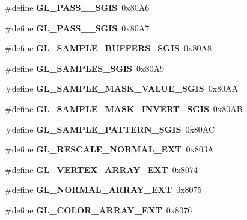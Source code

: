 \begin{DoxyCompactItemize}
\item 
\#define {\bfseries G\+L\+\_\+P\+A\+S\+S\+\_\+\_\+\+S\+G\+I\+S}~0x80\+A6\label{_s_d_l__opengl_8h_a66623e50c957f19c4754b68090f037ba}

\item 
\#define {\bfseries G\+L\+\_\+P\+A\+S\+S\+\_\+\_\+\+S\+G\+I\+S}~0x80\+A7\label{_s_d_l__opengl_8h_a44803f3eb30e5141f36a6a303253e6b9}

\item 
\#define {\bfseries G\+L\+\_\+\+S\+A\+M\+P\+L\+E\+\_\+\+B\+U\+F\+F\+E\+R\+S\+\_\+\+S\+G\+I\+S}~0x80\+A8\label{_s_d_l__opengl_8h_a9bb9283642e0968f8fc36648efb88063}

\item 
\#define {\bfseries G\+L\+\_\+\+S\+A\+M\+P\+L\+E\+S\+\_\+\+S\+G\+I\+S}~0x80\+A9\label{_s_d_l__opengl_8h_ae8288aab3962697faacae653234bdcbb}

\item 
\#define {\bfseries G\+L\+\_\+\+S\+A\+M\+P\+L\+E\+\_\+\+M\+A\+S\+K\+\_\+\+V\+A\+L\+U\+E\+\_\+\+S\+G\+I\+S}~0x80\+A\+A\label{_s_d_l__opengl_8h_a7c6f46865103580482285addda4bdc46}

\item 
\#define {\bfseries G\+L\+\_\+\+S\+A\+M\+P\+L\+E\+\_\+\+M\+A\+S\+K\+\_\+\+I\+N\+V\+E\+R\+T\+\_\+\+S\+G\+I\+S}~0x80\+A\+B\label{_s_d_l__opengl_8h_a9327cbd41490fd9bc8e92f5d02450920}

\item 
\#define {\bfseries G\+L\+\_\+\+S\+A\+M\+P\+L\+E\+\_\+\+P\+A\+T\+T\+E\+R\+N\+\_\+\+S\+G\+I\+S}~0x80\+A\+C\label{_s_d_l__opengl_8h_a0e0ca405513fabdbf243c1b19d169116}

\item 
\#define {\bfseries G\+L\+\_\+\+R\+E\+S\+C\+A\+L\+E\+\_\+\+N\+O\+R\+M\+A\+L\+\_\+\+E\+X\+T}~0x803\+A\label{_s_d_l__opengl_8h_ac2001da5ac3fa43af22c7ff338ebca26}

\item 
\#define {\bfseries G\+L\+\_\+\+V\+E\+R\+T\+E\+X\+\_\+\+A\+R\+R\+A\+Y\+\_\+\+E\+X\+T}~0x8074\label{_s_d_l__opengl_8h_a603e034055a458b4916623c096f26960}

\item 
\#define {\bfseries G\+L\+\_\+\+N\+O\+R\+M\+A\+L\+\_\+\+A\+R\+R\+A\+Y\+\_\+\+E\+X\+T}~0x8075\label{_s_d_l__opengl_8h_abc658a2f91bfb6c203bb52a2cff75839}

\item 
\#define {\bfseries G\+L\+\_\+\+C\+O\+L\+O\+R\+\_\+\+A\+R\+R\+A\+Y\+\_\+\+E\+X\+T}~0x8076\label{_s_d_l__opengl_8h_acef31c990755e5735c51cddb326341c5}


\end{DoxyCompactItemize}

